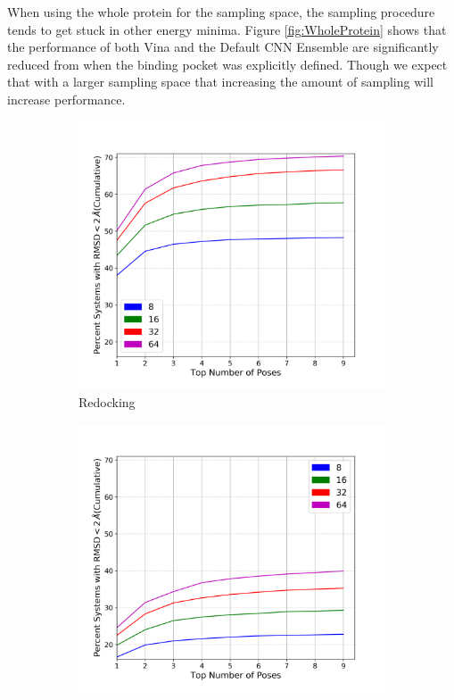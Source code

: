 \documentclass[journal=jcisd8,manuscript=article]{achemso}
\begin{document}
When using the whole protein for the sampling space, the sampling procedure tends to get stuck in other energy minima. Figure \ref{fig:WholeProtein} shows that the performance of both Vina and the Default CNN Ensemble are significantly reduced from when the binding pocket was explicitly defined. Though we expect that with a larger sampling space that increasing the amount of sampling will increase performance.
\begin{figure}    
        \begin{subfigure}[b]{0.48\textwidth}    
    		\centering
    		\includegraphics[width=\textwidth]{figures/redocking/whole_ptn_sweep_exhaustiveness_line.png}
    		\caption{Redocking}
    		\label{fig:WholeProteinRD}
        \end{subfigure}    
        \begin{subfigure}[b]{0.48\textwidth}    
    		\centering
    		\includegraphics[width=\textwidth]{figures/crossdocking/whole_ptn_sweep_exhaustiveness_line.png}

\end{subfigure}
\end{figure}
\end{document}
